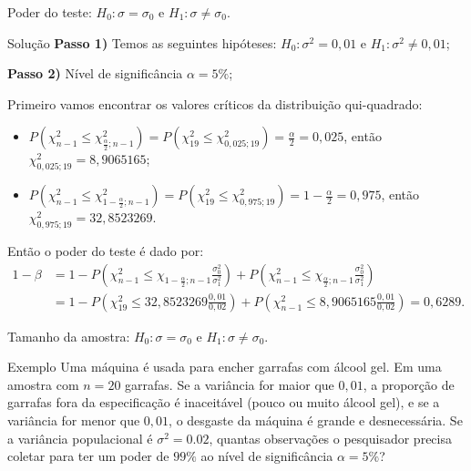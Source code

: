 \documentclass[8pt]{beamer}
\begin{document}
\begin{frame}{Poder do teste: $H_0: \sigma = \sigma_0$ e $H_1: \sigma \neq \sigma_0$.}


\begin{block}{Solução}
	\textbf{Passo 1)} Temos as seguintes hipóteses: $H_0: \sigma^2 = 0,01$ e $H_1: \sigma^2 \neq 0,01$;
	
	\textbf{Passo 2)} Nível de significância $\alpha=5\%$;
	
	Primeiro vamos encontrar os valores críticos da distribuição qui-quadrado:
	\begin{itemize}
		\item $P\left( \chi_{n-1}^2 \leq \chi_{\frac{\alpha}{2}; n-1}^2 \right) = P \left( \chi_{19}^2 \leq \chi_{0,025; 19}^2 \right) = \frac{\alpha}{2} = 0,025$, então $\chi_{0,025; 19}^2 = 8,9065165$;
		\item $P\left( \chi_{n-1}^2 \leq \chi_{1-\frac{\alpha}{2}; n-1}^2 \right) = P \left( \chi_{19}^2 \leq \chi_{0,975; 19}^2 \right) = 1-\frac{\alpha}{2} = 0,975$, então $\chi_{0,975; 19}^2 = 32,8523269$.
	\end{itemize}
	
	Então o poder do teste é dado por:
	\begin{align*}
	1-\beta &= 1 -P \left( \chi_{n-1}^2 \leq \chi_{1-\frac{\alpha}{2};n-1} \frac{\sigma_0^2}{\sigma_1^2} \right) + P \left( \chi_{n-1}^2 \leq \chi_{\frac{\alpha}{2};n-1} \frac{\sigma_0^2}{\sigma_1^2} \right)\\
	&=1 -P \left( \chi_{19}^2 \leq 32,8523269 \frac{0,01}{0,02} \right) + P \left( \chi_{n-1}^2 \leq 8,9065165 \frac{0,01}{0,02} \right) = 0,6289.
	\end{align*}
\end{block}

\end{frame}

\begin{frame}{Tamanho da amostra: $H_0: \sigma = \sigma_0$ e $H_1: \sigma \neq \sigma_0$.}

\large
\begin{block}{Exemplo}
	Uma máquina é usada para encher garrafas com álcool gel. Em uma amostra com $n=20$ garrafas. Se a variância for maior que $0,01$, a proporção de garrafas fora da especificação é inaceitável (pouco ou muito álcool gel), e se a variância for menor que $0,01$, o desgaste da máquina é grande e desnecessária. Se a variância populacional é $\sigma^2=0.02$, quantas observações o pesquisador precisa coletar para ter um poder de $99\%$ ao nível de significância $\alpha=5\%$?
\end{block}
\normalsize

\end{frame}
\end{document}
